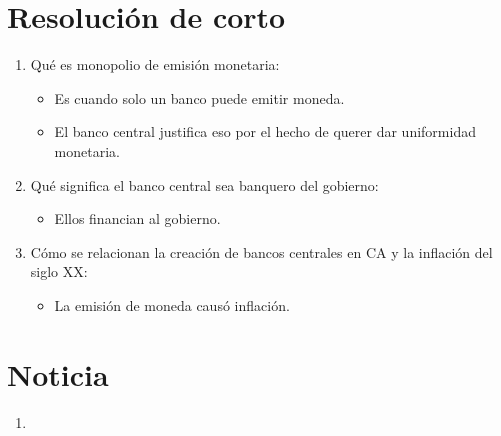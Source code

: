\section{Resolución de corto}
\begin{enumerate}
    \item Qué es monopolio de emisión monetaria:
        \begin{itemize}
            \item Es cuando solo un banco puede emitir moneda.
            \item El banco central justifica eso por el hecho de querer dar uniformidad monetaria.
        \end{itemize}
    \item Qué significa el banco central sea banquero del gobierno:
        \begin{itemize}
            \item Ellos financian al gobierno.
        \end{itemize}
    \item Cómo se relacionan la creación de bancos centrales en CA y la inflación del siglo XX: 
        \begin{itemize}
            \item La emisión de moneda causó inflación.
        \end{itemize}
\end{enumerate}

\section{Noticia}
\begin{enumerate}
    \item 
\end{enumerate}
